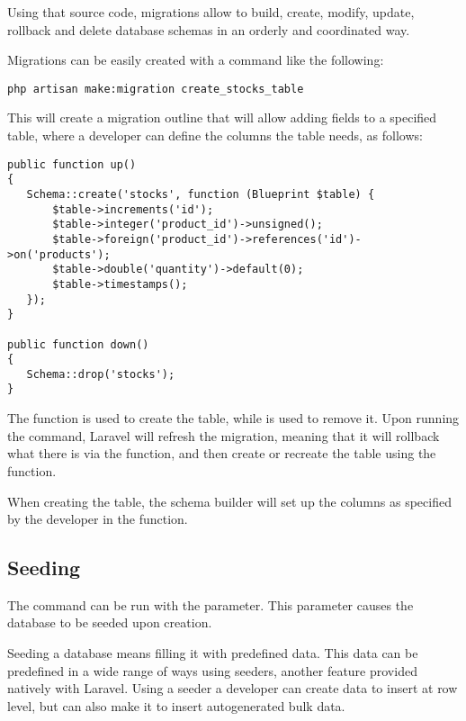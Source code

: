 Using that source code, migrations allow to build, create, modify, update, rollback and delete  database schemas in an orderly and coordinated way.

Migrations can be easily created with a command like the following:

\begin{verbatim}
php artisan make:migration create_stocks_table
\end{verbatim}

This will create a migration outline that will allow adding fields to a specified table, where a developer can define the columns the table needs, as follows:

\begin{verbatim}
public function up()
{
   Schema::create('stocks', function (Blueprint $table) {
       $table->increments('id');
       $table->integer('product_id')->unsigned();
       $table->foreign('product_id')->references('id')->on('products');
       $table->double('quantity')->default(0);
       $table->timestamps();
   });
}

public function down()
{
   Schema::drop('stocks');
}
\end{verbatim}

The  function is used to create the table, while  is used to remove it. Upon running the  command, Laravel will refresh the migration, meaning that it will rollback what there is via the  function, and then create or recreate the table using the  function.

When creating the table, the schema builder will set up the columns as specified by the developer in the  function.

\subsection{Seeding}
The  command can be run with the  parameter. This parameter causes the database to be seeded upon creation.

Seeding a database means filling it with predefined data. This data can be predefined in a wide range of ways using seeders, another feature provided natively with Laravel. Using a seeder a developer can create data to insert at row level, but can also make it to insert autogenerated bulk data.

